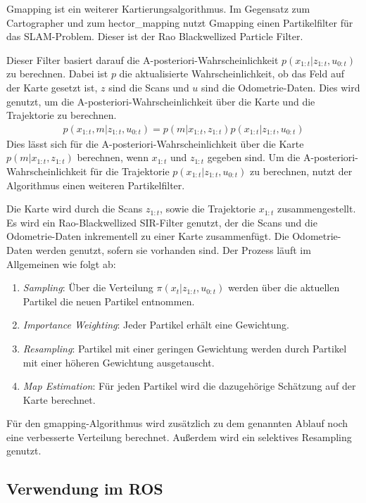 Gmapping ist ein weiterer Kartierungsalgorithmus. Im Gegensatz zum Cartographer und zum hector\_mapping nutzt Gmapping einen Partikelfilter für das \ac{SLAM}-Problem. Dieser ist der Rao Blackwellized Particle Filter.

Dieser Filter basiert darauf die A-posteriori-Wahrscheinlichkeit $ p(x_{1:t} | z_{1:t},u_{0:t}) $ zu berechnen. Dabei ist $ p $ die aktualisierte Wahrscheinlichkeit, ob das Feld auf der Karte gesetzt ist, $ z $ sind die Scans und $ u $ sind die Odometrie-Daten. Dies wird genutzt, um die A-posteriori-Wahrscheinlichkeit über die Karte und die Trajektorie zu berechnen.
\begin{align}
    p(x_{1:t}, m | z_{1:t},u_{0:t}) = p(m | x_{1:t}, z_{1:t})p(x_{1:t} | z_{1:t},u_{0:t})
\end{align}
Dies lässt sich für die A-posteriori-Wahrscheinlichkeit über die Karte $ p(m | x_{1:t}, z_{1:t}) $ berechnen, wenn $ x_{1:t} $ und $ z_{1:t} $ gegeben sind. Um die A-posteriori-Wahrscheinlichkeit für die Trajektorie $ p(x_{1:t} | z_{1:t},u_{0:t}) $ zu berechnen, nutzt der Algorithmus einen weiteren Partikelfilter.

Die Karte wird durch die Scans $ z_{1:t} $, sowie die Trajektorie $ x_{1:t} $ zusammengestellt. Es wird ein Rao-Blackwellized \ac{SIR}-Filter genutzt, der die Scans und die Odometrie-Daten inkrementell zu einer Karte zusammenfügt. Die Odometrie-Daten werden genutzt, sofern sie vorhanden sind. Der Prozess läuft im Allgemeinen wie folgt ab:

\begin{enumerate}
  \item \textit{Sampling}: Über die Verteilung $ \pi(x_{t} | z_{1:t},u_{0:t}) $ werden über die aktuellen Partikel die neuen Partikel entnommen.
  \item \textit{Importance Weighting}: Jeder Partikel erhält eine Gewichtung.
  \item \textit{Resampling}: Partikel mit einer geringen Gewichtung werden durch Partikel mit einer höheren Gewichtung ausgetauscht.
  \item \textit{Map Estimation}: Für jeden Partikel wird die dazugehörige Schätzung auf der Karte berechnet.
\end{enumerate}

Für den gmapping-Algorithmus wird zusätzlich zu dem genannten Ablauf noch eine verbesserte Verteilung berechnet. Außerdem wird ein selektives Resampling genutzt. \autocite{gmapping} \autocite{gmapping2}

\subsection{Verwendung im \acl{ROS}} \label{rosVerwendungGmapping}


